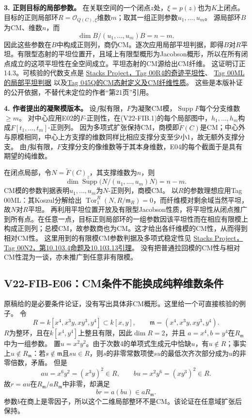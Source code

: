 \documentclass[UTF8,a4paper]{ctexbook}
\begin{document}
\noindent\textbf{3. 正则目标的局部参数。}
在关联空间的一个闭点$z$处，$\xi=p(z)$也为$K$上闭点。目标的正则局部环$R=\mathcal O_{Q(C),\xi}$维数$m$；取其一组正则参数$u_1,\ldots,u_m$。
源局部环$B$为CM、维数$n$，而
\[
\dim B/(u_1,\ldots,u_m)B=n-m.
\]
因此这些参数在$B$中构成正则列，商仍CM。逐次应用局部平坦判据，即得$B$对$R$平坦。有限型态射的平坦位置开，且域上有限型概形为Jacobson概形，所以在所有闭点成立的这项平坦性在全空间成立。平坦态射的CM源给出CM纤维。
这证明订正14.3。可核验的代数支点是
\href{https://stacks.math.columbia.edu/tag/00R4}{Stacks Project，Tag 00R4的奇迹平坦性}、
\href{https://stacks.math.columbia.edu/tag/00ML}{Tag 00ML的局部平坦判据}
以及\href{https://stacks.math.columbia.edu/tag/045Q}{Tag 045Q的CM态射定义及CM纤维性质}。
这些是本版补证的公开依据，不替代未定位的作者“第21页”引用。

\noindent\textbf{4. 作者提出的凝聚模版本。}
设$f$拟有限，$F$为凝聚CM模，$\operatorname{Supp}F$每个分支维数$\geq m$。
对中心应用E02的$F$-正则性，在(V22-FIB.1)的每个局部图中，$h_1,\ldots,h_m$构成$F[t_1,\ldots,t_m]$-正则列。
因为多项式扩张保持CM，商模即$\widetilde F(C)$是CM；中心外与原模相同，中心上方支撑的维数同样比相应支撑分支至少小1，故无额外支撑分支。
由$f$拟有限，$F$支撑分支的像维数等于其本身维数，E04的每个截面于是具有期望的纯维数。

在闭点局部，令$N=\widetilde F(C)_z$，其支撑维数为$n$，则
\[
\dim\operatorname{Supp}\bigl(N/(u_1,\ldots,u_m)N\bigr)=n-m.
\]
CM模的参数判据表明$u_1,\ldots,u_m$为$N$-正则列，商模CM。
以$R$的参数理想应用Tag 00ML：其Koszul分解给出
$\operatorname{Tor}_1^R(N,R/\mathfrak m_R)=0$，而纤维模对剩余域当然平坦，故$N$对$R$平坦。
再利用平坦位置开放及有限型Jacobson性质，将平坦性从闭点推广到所有点。在任意一点，目标正则局部环的一组参数因该平坦性而在相应有限模上构成正则列；总模CM，故参数商也为CM。这才给出各纤维模的CM性，从而得到相对CM性。
这里用到的有限模CM参数判据及多项式稳定性见
\href{https://stacks.math.columbia.edu/tag/00N2}{Stacks Project，Tag 00N2，第10.103.4命题及10.103.13引理}。
没有把普通拉回模的CM性与相对CM性混为一谈，亦未推广到任意非有限模。

\subsection*{V22-FIB-E06：CM条件不能换成纯粹维数条件}

原稿给的是必要条件论证，没有写出具体非CM概形。这里给一个可直接核验的例子。
令
\[
R=k[x^4,x^3y,xy^3,y^4]\subset k[x,y],
\qquad
\mathfrak m=(x^4,x^3y,xy^3,y^4).
\]
$R$为整环，且在$k[x^4,y^4]$上整且有限，因此$\dim R=2$，并且
$a=x^4,b=y^4$在$R_\mathfrak m$中为一组参数。
置$u=x^2y^2$。由于次数4的单项式生成元中恰缺$u$，有$u\notin R$；事实上$u\notin R_\mathfrak m$：若$s\notin\mathfrak m$且$su\in R$，则$s$的非零常数项使$su$的最低次齐次部分成为$u$的非零倍数，矛盾。
但是
\[
au=x^6y^2=(x^3y)^2\in R,\qquad
bu=x^2y^6=(xy^3)^2\in R.
\]
故$r=au$在$R_\mathfrak m/aR_\mathfrak m$中非零，却满足
\[
br=a(bu)\in aR_\mathfrak m.
\]
参数$b$在商上是零因子，所以这个二维局部整环不是CM。该论证在任意域扩张后保持。
\end{document}
